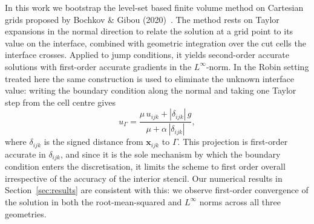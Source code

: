 
In this work we bootstrap the level-set based finite volume method on Cartesian grids
proposed by Bochkov \& Gibou (2020)~\cite{bochkov2020}. The method rests on Taylor
expansions in the normal direction to relate the solution at a grid point to its value
on the interface, combined with geometric integration over the cut cells the interface
crosses. Applied to jump conditions, it yields second-order accurate solutions with
first-order accurate gradients in the $L^{\infty}$-norm. In the Robin setting treated
here the same construction is used to eliminate the unknown interface value: writing
the boundary condition along the normal and taking one Taylor step from the cell centre
gives
\begin{equation}
    u_{\Gamma} = \frac{\mu\, u_{ijk} + |\delta_{ijk}|\, g}
                      {\mu + \alpha\, |\delta_{ijk}|},
    \label{eq:taylor_robin}
\end{equation}
where $\delta_{ijk}$ is the signed distance from $\mathbf{x}_{ijk}$ to $\Gamma$. This
projection is first-order accurate in $\delta_{ijk}$, and since it is the sole
mechanism by which the boundary condition enters the discretisation, it limits the
scheme to first order overall irrespective of the accuracy of the interior stencil.
Our numerical results in Section~\ref{sec:results} are consistent with this: we
observe first-order convergence of the solution in both the root-mean-squared and
$L^{\infty}$ norms across all three geometries.


%
